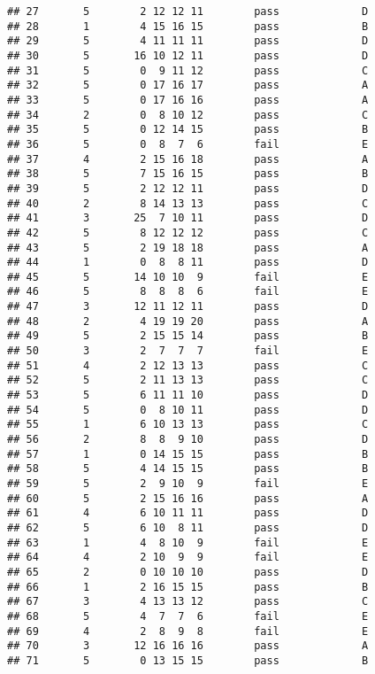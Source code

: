\documentclass[
]{article}
\begin{document}
\begin{verbatim}
## 27       5        2 12 12 11        pass             D
## 28       1        4 15 16 15        pass             B
## 29       5        4 11 11 11        pass             D
## 30       5       16 10 12 11        pass             D
## 31       5        0  9 11 12        pass             C
## 32       5        0 17 16 17        pass             A
## 33       5        0 17 16 16        pass             A
## 34       2        0  8 10 12        pass             C
## 35       5        0 12 14 15        pass             B
## 36       5        0  8  7  6        fail             E
## 37       4        2 15 16 18        pass             A
## 38       5        7 15 16 15        pass             B
## 39       5        2 12 12 11        pass             D
## 40       2        8 14 13 13        pass             C
## 41       3       25  7 10 11        pass             D
## 42       5        8 12 12 12        pass             C
## 43       5        2 19 18 18        pass             A
## 44       1        0  8  8 11        pass             D
## 45       5       14 10 10  9        fail             E
## 46       5        8  8  8  6        fail             E
## 47       3       12 11 12 11        pass             D
## 48       2        4 19 19 20        pass             A
## 49       5        2 15 15 14        pass             B
## 50       3        2  7  7  7        fail             E
## 51       4        2 12 13 13        pass             C
## 52       5        2 11 13 13        pass             C
## 53       5        6 11 11 10        pass             D
## 54       5        0  8 10 11        pass             D
## 55       1        6 10 13 13        pass             C
## 56       2        8  8  9 10        pass             D
## 57       1        0 14 15 15        pass             B
## 58       5        4 14 15 15        pass             B
## 59       5        2  9 10  9        fail             E
## 60       5        2 15 16 16        pass             A
## 61       4        6 10 11 11        pass             D
## 62       5        6 10  8 11        pass             D
## 63       1        4  8 10  9        fail             E
## 64       4        2 10  9  9        fail             E
## 65       2        0 10 10 10        pass             D
## 66       1        2 16 15 15        pass             B
## 67       3        4 13 13 12        pass             C
## 68       5        4  7  7  6        fail             E
## 69       4        2  8  9  8        fail             E
## 70       3       12 16 16 16        pass             A
## 71       5        0 13 15 15        pass             B

\end{verbatim}
\end{document}
